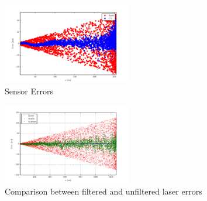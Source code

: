 \documentclass[journal, 10pt]{IEEEtran}
\begin{document}
\begin{figure}
\begin{center}
\includegraphics[width=0.5\textwidth]{figures/SensorErrors.pdf}
\caption{Sensor Errors}
\label{error}
\end{center}
\end{figure}

\begin{figure}
\begin{center}
\includegraphics[width=0.5\textwidth]{figures/lasererror.pdf}
\caption{Comparison between filtered and unfiltered laser errors}
\label{laser_error}
\end{center}
\end{figure}
\end{document}
